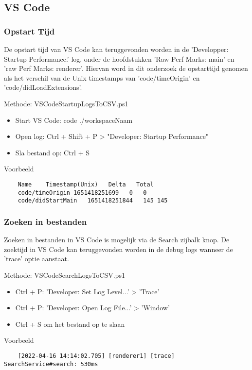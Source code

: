 \subsection{VS Code}
\subsubsection{Opstart Tijd}
De opstart tijd van VS Code kan teruggevonden worden in de 'Developper: Startup Performance.' log, onder de hoofdstukken 'Raw Perf Marks: main' en 'raw Perf Marks: renderer'. Hiervan word in dit onderzoek de opstarttijd genomen als het verschil van de Unix timestamps van 'code/timeOrigin' en 'code/didLoadExtensions'.

\newpage

Methode: VSCodeStartupLogsToCSV.ps1
\begin{itemize}
	\item Start VS Code: code ./workspaceNaam
	\item Open log: Ctrl + Shift + P > "Developer: Startup Performance"
	\item Sla bestand op: Ctrl + S
\end{itemize}

Voorbeeld
\vspace{\verbatimOffset}
\begin{verbatim}
    Name    Timestamp(Unix)   Delta   Total
    code/timeOrigin 1651418251699   0   0
    code/didStartMain   1651418251844   145 145
\end{verbatim}

\subsubsection{Zoeken in bestanden}
Zoeken in bestanden in VS Code is mogelijk via de Search zijbalk knop. De zoektijd in VS Code kan teruggevonden worden in de debug logs wanneer de 'trace' optie aanstaat.

Methode: VSCodeSearchLogsToCSV.ps1
\begin{itemize}
	\item Ctrl + P: 'Developer: Set Log Level...' > 'Trace'
	\item Ctrl + P: 'Developer: Open Log File...' > 'Window'
	\item Ctrl + S om het bestand op te slaan
\end{itemize}

Voorbeeld
\vspace{\verbatimOffset}
\begin{verbatim}
    [2022-04-16 14:14:02.705] [renderer1] [trace] SearchService#search: 530ms
\end{verbatim}


